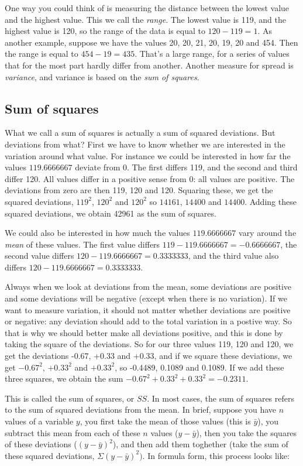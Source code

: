 One way you could think of is measuring the distance between the lowest value and the highest value. This we call the \textit{range}. The lowest value is 119, and the highest value is 120, so the range of the data is equal to $120-119=1$. As another example, suppose we have the values 20, 20, 21, 20, 19, 20 and 454. Then the range is equal to $454-19=435$. That's a large range, for a series of values that for the most part hardly differ from another. Another measure for spread is \textit{variance}, and variance is based on the \textit{sum of squares}. 

\subsection{Sum of squares}

What we call a sum of squares is actually a sum of squared deviations. But deviations from what? First we have to know whether we are interested in the variation around what value. For instance we could be interested in how far the values $119.6666667$ deviate from 0. The first differs 119, and the second and third differ 120. All values differ in a positive sense from 0: all values are positive. The deviations from zero are then 119, 120 and 120. Squaring these, we get the squared deviations, $119^2$, $120^2$ and $120^2$ so $14161$, $ 14400$ and $ 14400$. Adding these squared deviations, we obtain 42961 as the sum of squares. 

We could also be interested in how much the values $119.6666667$ vary around the \textit{mean} of these values. The first value differs $119-119.6666667= -0.6666667$, the second value differs $120-119.6666667= 0.3333333$, and the third value also differs $120-119.6666667= 0.3333333$.

Always when we look at deviations from the mean, some deviations are positive and some deviations will be negative (except when there is no variation). If we want to measure variation, it should not matter whether deviations are positive or negative: any deviation should add to the total variation in a postive way. So that is why we should better make all deviations positive, and this is done by taking the square of the deviations. So for our three values 119, 120 and 120, we get the deviations -0.67, +0.33 and +0.33, and if we square these deviations, we get $-0.67^2$, $+0.33^2$ and $+0.33^2$, so -0.4489, 0.1089 and 0.1089. If we add these three squares, we obtain the sum $-0.67^2+0.33^2+0.33^2=-0.2311$.   

This is called the sum of squares, or $SS$. In most cases, the sum of squares refers to the sum of squared deviations from the mean. In brief, suppose you have $n$ values of a variable $y$, you first take the mean of those values (this is $\bar{y}$), you subtract this mean from each of these $n$ values ($y-\bar{y}$), then you take the squares of these deviations ($(y-\bar{y})^2$), and then add them toghether (take the sum of these squared deviations, $\Sigma (y-\bar{y})^2)$. In formula form, this process looks like:

